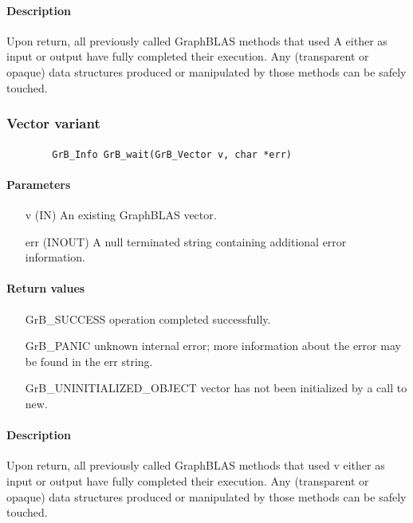 {\paragraph{Description}

Upon return, all previously called GraphBLAS methods that used {\sf A} either as 
input or output have fully completed their execution.
Any (transparent or opaque) data structures produced or manipulated by those 
methods can be safely touched.


\subsubsection{Vector variant}

\paragraph{\syntax}

\begin{verbatim}
        GrB_Info GrB_wait(GrB_Vector v, char *err)
\end{verbatim}

\paragraph{Parameters}

\begin{itemize}[leftmargin=1.1in]
	    \item[{\sf v}]   ({\sf IN})     An existing GraphBLAS vector.
        \item[{\sf err}] ({\sf INOUT})  A null terminated string containing additional error
information.
\end{itemize}

\paragraph{Return values}
\begin{itemize}[leftmargin=2.1in]
\item[{\sf GrB\_SUCCESS}]	operation completed successfully.
\item[{\sf GrB\_PANIC}]		unknown internal error; more information about the error may be found in the {\sf err} string.
\item[{\sf GrB\_UNINITIALIZED\_OBJECT}]  vector has not been initialized by a
                            call to {\sf new}.
\end{itemize}

\paragraph{Description}

Upon return, all previously called GraphBLAS methods that used {\sf v} either as
input or output have fully completed their execution.  Any (transparent or opaque)
data structures produced or manipulated by those methods can be safely touched.
}
